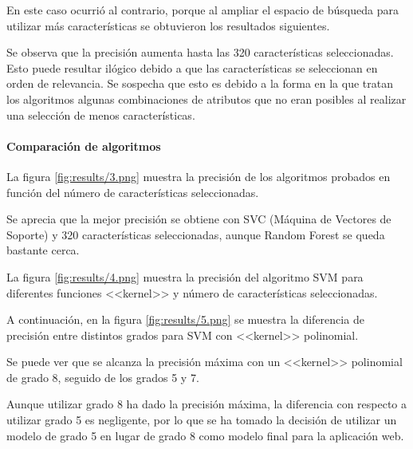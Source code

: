 En este caso ocurrió al contrario, porque al ampliar el espacio de búsqueda para
utilizar más características se obtuvieron los resultados siguientes.


Se observa que la precisión aumenta hasta las 320 características seleccionadas.
Esto puede resultar ilógico debido a que las características se seleccionan en
orden de relevancia. Se sospecha que esto es debido a la forma en la que tratan los
algoritmos algunas combinaciones de atributos que no eran posibles al realizar
una selección de menos características.

\paragraph{Comparación de algoritmos}

La figura \ref{fig:results/3.png} muestra la precisión de los algoritmos
probados en función del número de características seleccionadas.


Se aprecia que la mejor precisión se obtiene con SVC (Máquina de Vectores de
Soporte) y 320 características seleccionadas, aunque Random Forest se queda
bastante cerca.

La figura \ref{fig:results/4.png} muestra la precisión del algoritmo SVM para
diferentes funciones <<kernel>> y número de características seleccionadas.


A continuación, en la figura \ref{fig:results/5.png} se muestra la diferencia de
precisión entre distintos grados para SVM con <<kernel>> polinomial.


Se puede ver que se alcanza la precisión máxima con un <<kernel>> polinomial de
grado 8, seguido de los grados 5 y 7. 

Aunque utilizar grado 8 ha dado la precisión máxima, la diferencia con respecto
a utilizar grado 5 es negligente, por lo que se ha tomado la decisión de
utilizar un modelo de grado 5 en lugar de grado 8 como modelo final para la
aplicación web.

